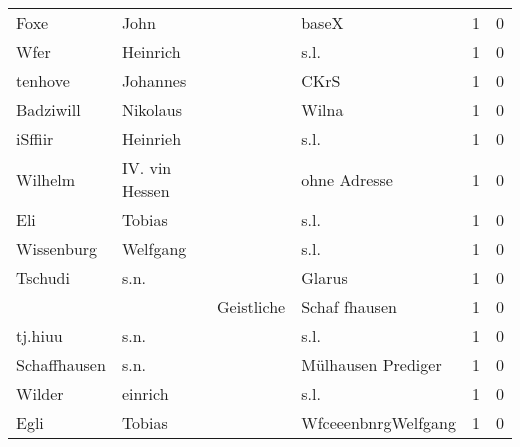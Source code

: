 \begin{center}
\begin{tiny}
\begin{longtabu}{llllrr}
                     Foxe &                               John &             &                                       baseX &          1 &         0 \\
                     Wfer &                           Heinrich &             &                                        s.l. &          1 &         0 \\
                  tenhove &                           Johannes &             &                                        CKrS &          1 &         0 \\
                Badziwill &                           Nikolaus &             &                                       Wilna &          1 &         0 \\
                  iSffiir &                           Heinrieh &             &                                        s.l. &          1 &         0 \\
                  Wilhelm &                     IV. vin Hessen &             &                                ohne Adresse &          1 &         0 \\
                      Eli &                             Tobias &             &                                        s.l. &          1 &         0 \\
               Wissenburg &                           Welfgang &             &                                        s.l. &          1 &         0 \\
                  Tschudi &                               s.n. &             &                                      Glarus &          1 &         0 \\
                          &                                    &  Geistliche &                               Schaf fhausen &          1 &         0 \\
                  tj.hiuu &                               s.n. &             &                                        s.l. &          1 &         0 \\
             Schaffhausen &                               s.n. &             &                          Mülhausen Prediger &          1 &         0 \\
                   Wilder &                            einrich &             &                                        s.l. &          1 &         0 \\
                     Egli &                             Tobias &             &                         WfceeenbnrgWelfgang &          1 &         0 \\

\end{longtabu}
\end{tiny}
\end{center}
